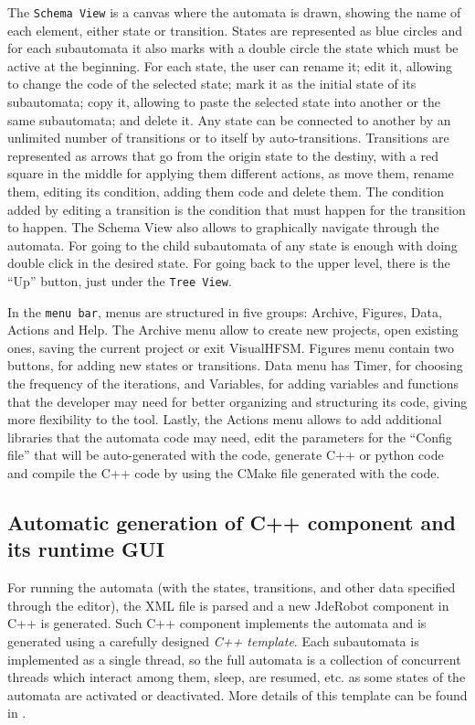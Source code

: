 \documentclass[journal,twoside]{JoPhA}
\begin{document}
The \texttt{Schema View} is a canvas where the automata is drawn, showing the name of each element, either state or transition. States are represented as blue circles and for each subautomata it also marks with a double circle the state which must be active at the beginning. For each state, the user can rename it; edit it, allowing to change the code of the selected state; mark it as the initial state of its subautomata; copy it, allowing to paste the selected state into another or the same subautomata; and delete it. Any state can be connected to another by an unlimited number of transitions or to itself by auto-transitions. Transitions are represented as arrows that go from the origin state to the destiny, with a red square in the middle for applying them different actions, as move them, rename them, editing its condition, adding them code and delete them. The condition added by editing a transition is the condition that must happen for the transition to happen. The Schema View also allows to graphically navigate through the automata. For going to the child subautomata of any state is enough with doing double click in the desired state. For going back to the upper level, there is the “Up” button, just under the \texttt{Tree View}.

In the \texttt{menu bar}, menus are structured in five groups: Archive, Figures, Data, Actions and Help. The Archive menu allow to create new projects, open existing ones, saving the current project or exit VisualHFSM. Figures menu contain two buttons, for adding new states or transitions. Data menu has Timer, for choosing the frequency of the iterations, and Variables, for adding variables and functions that the developer may need for better organizing and structuring its code, giving more flexibility to the tool. Lastly, the Actions menu allows to add additional libraries that the automata code may need, edit the parameters for the “Config file” that will be auto-generated with the code, generate C++ or python code and compile the C++ code by using the CMake file generated with the code.

\subsection{Automatic generation of C++ component and its runtime GUI}

For running the automata (with the states, transitions, and other data specified through the editor), the XML file is parsed and a new JdeRobot component in C++ is generated. Such C++ component implements the automata and is generated using a carefully designed \textit{C++ template}. Each subautomata is implemented as a single thread, so the full automata is a collection of concurrent threads which interact among them, sleep, are resumed, etc. as some states of the automata are activated or deactivated. More details of this template can be found in \cite{borja2013}.
\end{document}
